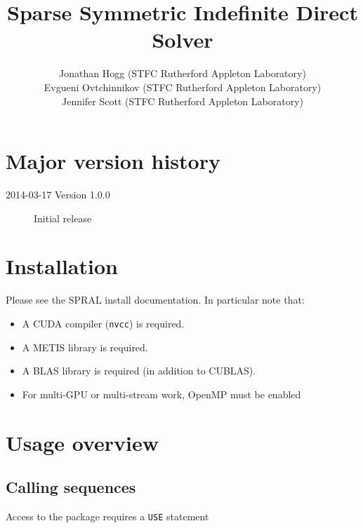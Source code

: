 \documentclass{spral}
\begin{document}
\title{Sparse Symmetric Indefinite Direct Solver}
\author{
   Jonathan Hogg (STFC Rutherford Appleton Laboratory) \\
   Evgueni Ovtchinnikov (STFC Rutherford Appleton Laboratory) \\
   Jennifer Scott (STFC Rutherford Appleton Laboratory)
}
\maketitle
\thispagestyle{firststyle}

\section*{Major version history}
\begin{description}
\item[2014-03-17 Version 1.0.0] Initial release
\end{description}


\section{Installation}
Please see the SPRAL install documentation. In particular note that:
\begin{itemize}
   \item A CUDA compiler (\texttt{nvcc}) is required.
   \item A METIS library is required.
   \item A BLAS library is required (in addition to CUBLAS).
   \item For multi-GPU or multi-stream work, OpenMP must be enabled
\end{itemize}


\section{Usage overview}

\subsection{Calling sequences}

Access to the package requires a {\tt USE} statement \\ \\
\indent\hspace{8mm}{\tt use spral\_ssids} \\
\end{document}
